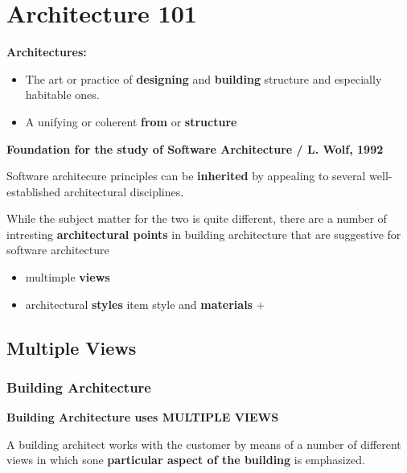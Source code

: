 \section{Architecture 101}



\textbf{Architectures:}
\begin{itemize}
	\item The art or practice of \textbf{designing} and \textbf{building} structure and especially habitable ones.
	\item A unifying or coherent \textbf{from} or \textbf{structure}
\end{itemize}

\textbf{Foundation for the study of Software Architecture / L. Wolf, 1992}

Software architecure principles can be \textbf{inherited} by appealing to several well-established architectural disciplines.

While the subject matter for the two is quite different, there are a number of intresting \textbf{architectural points} in building architecture that are suggestive for software architecture
\begin{itemize}
	\item multimple \textbf{views}
	\item architectural \textbf{styles}
	item style and \textbf{materials}
+\end{itemize}

\subsection{Multiple Views}

\subsubsection{Building Architecture}

\textbf{Building Architecture uses MULTIPLE VIEWS}

A building architect works with the customer by means of a number of different views in which sone \textbf{particular aspect of the building} is emphasized.

